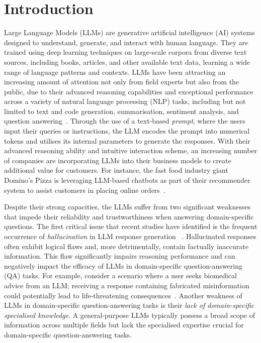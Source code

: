 \section*{Introduction}\label{sec:introduction}

Large Language Models (LLMs) are generative artificial intelligence (AI) systems designed to understand, generate, and interact with human language. They are trained using deep learning techniques on large-scale corpora from diverse text sources, including books, articles, and other available text data, learning a wide range of language patterns and contexts. LLMs have been attracting an increasing amount of attention not only from field experts but also from
the public, due to their advanced reasoning capabilities and exceptional performance across a variety of natural language processing (NLP)
tasks, including but not limited to text and code generation, summarisation, sentiment analysis, and question answering~\parencite{brown2020language, zero-shot-reasoner, palm, won2024scaling}.
Through the use of a text-based \emph{prompt}, where the users input their queries or instructions,
the LLM encodes the prompt into numerical tokens and utilises its internal parameters
to generate the responses.
With their advanced reasoning ability and intuitive interaction scheme, an increasing number of companies are incorporating LLMs into their business models to create additional value for customers. For instance, the fast food industry giant Domino's Pizza is leveraging LLM-based chatbots as part of their recommender system
to assist customers in placing online orders~\parencite{dominos_ai}.

Despite their strong capacities, the LLMs suffer from two significant weaknesses that impede their reliability and trustworthiness when answering domain-specific questions. 
The first critical issue that recent studies have identified is the frequent occurrence of \emph{hallucination} in LLM response generation
~\parencite{kgr, kalm-prompting, huang2023survey, ji2023survey}. 
Hallucinated responses often exhibit logical flaws and, more detrimentally, contain factually inaccurate information.
This flaw significantly impairs reasoning performance and can negatively impact the efficacy of LLMs in domain-specific question-answering (QA) tasks.
For example, consider a scenario where a user seeks biomedical advice from an LLM; receiving a response containing fabricated misinformation could potentially lead to life-threatening consequences~\parencite{pmc-llama}.
Another weakness of LLMs in domain-specific question-answering tasks is their \emph{lack of domain-specific specialised knowledge}.
A general-purpose LLMs typically possess a broad scope of information across multiple fields but lack the specialised expertise crucial for domain-specific question-answering tasks.

